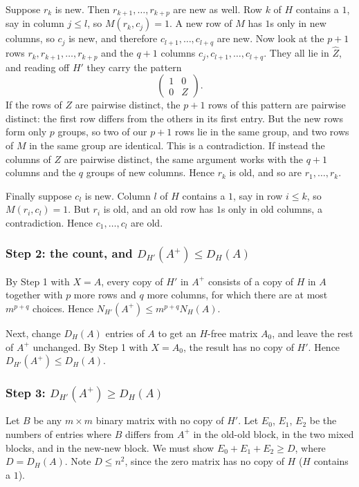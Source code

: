 \documentclass{article}
\theoremstyle{plain}
\theoremstyle{definition}
\begin{document}
Suppose $r_k$ is new. Then $r_{k+1}, \dots, r_{k+p}$ are new as well. Row $k$ of $H$ contains a
$1$, say in column $j \le l$, so $M(r_k, c_j) = 1$. A new row of $M$ has $1$s only in new
columns, so $c_j$ is new, and therefore $c_{l+1}, \dots, c_{l+q}$ are new. Now look at the $p+1$
rows $r_k, r_{k+1}, \dots, r_{k+p}$ and the $q+1$ columns $c_j, c_{l+1}, \dots, c_{l+q}$. They
all lie in $\widehat{Z}$, and reading off $H'$ they carry the pattern
\[
\begin{pmatrix} 1 & 0 \\ 0 & Z \end{pmatrix}.
\]
If the rows of $Z$ are pairwise distinct, the $p+1$ rows of this pattern are pairwise distinct:
the first row differs from the others in its first entry. But the new rows form only $p$
groups, so two of our $p+1$ rows lie in the same group, and two rows of $M$ in the same group
are identical. This is a contradiction. If instead the columns of $Z$ are pairwise distinct, the
same argument works with the $q+1$ columns and the $q$ groups of new columns. Hence $r_k$ is
old, and so are $r_1, \dots, r_k$.

Finally suppose $c_l$ is new. Column $l$ of $H$ contains a $1$, say in row $i \le k$, so
$M(r_i, c_l) = 1$. But $r_i$ is old, and an old row has $1$s only in old columns, a
contradiction. Hence $c_1, \dots, c_l$ are old.

\subsubsection*{Step 2: the count, and $D_{H'}(A^+) \le D_H(A)$}

By Step 1 with $X = A$, every copy of $H'$ in $A^+$ consists of a copy of $H$ in $A$ together
with $p$ more rows and $q$ more columns, for which there are at most $m^{p+q}$ choices. Hence
$N_{H'}(A^+) \le m^{p+q} N_H(A)$.

Next, change $D_H(A)$ entries of $A$ to get an $H$-free matrix $A_0$, and leave the rest of
$A^+$ unchanged. By Step 1 with $X = A_0$, the result has no copy of $H'$. Hence
$D_{H'}(A^+) \le D_H(A)$.

\subsubsection*{Step 3: $D_{H'}(A^+) \ge D_H(A)$}

Let $B$ be any $m \times m$ binary matrix with no copy of $H'$. Let $E_0$, $E_1$, $E_2$ be the
numbers of entries where $B$ differs from $A^+$ in the old-old block, in the two mixed blocks,
and in the new-new block. We must show $E_0 + E_1 + E_2 \ge D$, where $D = D_H(A)$. Note
$D \le n^2$, since the zero matrix has no copy of $H$ ($H$ contains a $1$).
\end{document}
